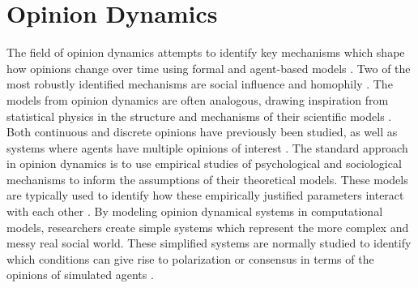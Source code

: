 \documentclass[11pt]{article}
\begin{document}
\section{Opinion Dynamics}
The field of opinion dynamics attempts to identify key mechanisms which shape how opinions change over time using formal and agent-based models \cite{flache_models_2017,flache_between_2018,noorazar_classical_2020}. Two of the most robustly identified mechanisms are social influence and homophily \cite{flache_models_2017}. The models from opinion dynamics are often analogous, drawing inspiration from statistical physics in the structure and mechanisms of their scientific models \cite{galesic_integrating_2021}. Both continuous and discrete opinions have previously been studied, as well as systems where agents have multiple opinions of interest \cite{flache_models_2017}. The standard approach in opinion dynamics is to use empirical studies of psychological and sociological mechanisms to inform the assumptions of their theoretical models. These models are typically used to identify how these empirically justified parameters interact with each other  \cite{baumann2021modeling,chacoma_opinion_2015,flache_models_2017,friedkin_social_1990,noorazar_classical_2020,spears_social_2021,turner_paths_2018}. By modeling opinion dynamical systems in computational models, researchers create simple systems which represent the more complex and messy real social world. These simplified systems are normally studied to identify which conditions can give rise to polarization or consensus in terms of the opinions of simulated agents \cite{flache_models_2017}.
\end{document}
